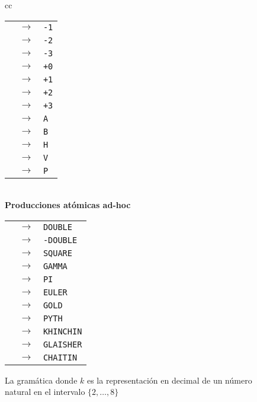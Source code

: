 \begin{figure}
\begin{center}
\begin{tabular}{cc}
\begin{minipage}[t]{0.35\textwidth}
    \begin{tabular}{rcl}
    \atom  & $\to$ & \verb#-1# %
    \\
    \atom  & $\to$ & \verb#-2# %
    \\
    \atom  & $\to$ & \verb#-3# %
    \\
    \atom  & $\to$ & \verb#+0# %
    \\
    \atom  & $\to$ & \verb#+1# %
    \\
    \atom  & $\to$ & \verb#+2# %
    \\
    \atom  & $\to$ & \verb#+3# %
    \\
    \atom  & $\to$ & \verb#A # %
    \\
    \atom  & $\to$ & \verb#B # %
    \\
    \atom  & $\to$ & \verb#H # %
    \\
    \atom  & $\to$ & \verb#V # %
    \\
    \atom  & $\to$ & \verb#P # %
    \end{tabular}
    \bigskip
    \end{minipage}
    \\
    \medskip
    {\bf Producciones atómicas ad-hoc}\\
    \medskip
    \begin{tabular}{rcl}
    \atom  & $\to$ & \verb#DOUBLE# 
    \\
    \atom  & $\to$ & \verb#-DOUBLE#
    \\
    \atom  & $\to$ & \verb#SQUARE#
    \\
    \atom  & $\to$ & \verb#GAMMA# 
    \\
    \atom  & $\to$ & \verb#PI# 
    \\
    \atom  & $\to$ & \verb#EULER#
    \\
    \atom  & $\to$ & \verb#GOLD#
    \\
    \atom  & $\to$ & \verb#PYTH#
    \\
    \atom  & $\to$ & \verb#KHINCHIN#
    \\
    \atom  & $\to$ & \verb#GLAISHER#
    \\
    \atom  & $\to$ & \verb#CHAITIN#
    \end{tabular}
    
\end{tabular}
\end{center}
\caption{La gramática \gramgeoprima donde $k$ es la representación en decimal de un número natural en el intervalo $\{2,\dots,8\}$}
\label{fig:gramgeoprima}
\end{figure}


